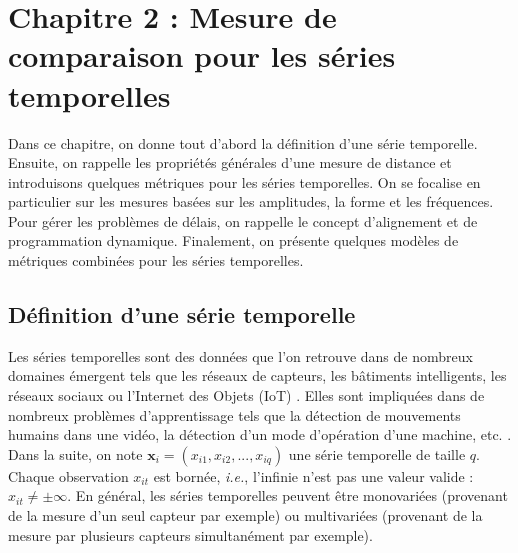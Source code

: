 \chapter*{Chapitre 2 : Mesure de comparaison pour les séries temporelles}

Dans ce chapitre, on donne tout d'abord la définition d'une série temporelle. Ensuite, on rappelle les propriétés générales d'une mesure de distance et introduisons quelques métriques pour les séries temporelles. On se focalise en particulier sur les mesures basées sur les amplitudes, la forme et les fréquences. Pour gérer les problèmes de délais, on rappelle le concept d'alignement et de programmation dynamique. Finalement, on présente quelques modèles de métriques combinées pour les séries temporelles. 

\section*{Définition d'une série temporelle}
Les séries temporelles sont des données que l'on retrouve dans de nombreux domaines émergent tels que les réseaux de capteurs, les bâtiments intelligents, les réseaux sociaux ou l'Internet des Objets (IoT) \cite{Najmeddine2012,Nguyen2012,Yin2008}. Elles sont impliquées dans de nombreux problèmes d'apprentissage tels que la détection de mouvements humains dans une vidéo, la détection d'un mode d'opération d'une machine, etc. \cite{PANAGIOTAKIS2008,Ramasso2008}. \\
\indent Dans la suite, on note $\textbf{x}_i=(x_{i1}, x_{i2}, ..., x_{iq})$ une série temporelle de taille $q$. Chaque observation $x_{it}$ est bornée, \textit{i.e.},  l'infinie n'est pas une valeur valide : $x_{it} \neq \pm \infty$. En général, les séries temporelles peuvent être monovariées (provenant de la mesure d'un seul capteur par exemple) ou multivariées (provenant de la mesure par plusieurs capteurs simultanément par exemple). 


